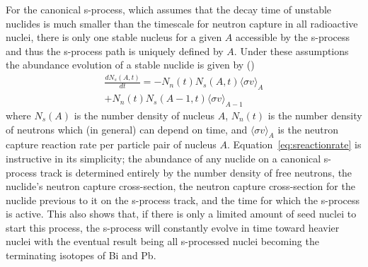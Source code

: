 For the canonical s-process, which assumes that the decay time of
unstable nuclides is much smaller than the timescale for neutron
capture in all radioactive nuclei, there is only one stable nucleus
for a given $A$ accessible by the s-process and thus the s-process
path is uniquely defined by $A$.  Under these assumptions the abundance
evolution of a stable nuclide is given by (\citealt{iliadis2008})
\begin{multline}
\label{eq:sreactionrate}
\frac{dN_s(A,t)}{dt} = - N_n(t)N_s(A,t)\langle \sigma v \rangle_A \\
+N_n(t)N_s(A-1,t)\langle \sigma v \rangle_{A-1}
\end{multline}
where $N_s(A)$ is the number density of nucleus $A$, $N_n(t)$ is the
number density of neutrons which (in general) can depend on time, and
$\langle \sigma v \rangle_A$ is the
neutron capture reaction rate per particle pair of nucleus $A$.
Equation~\ref{eq:sreactionrate} is instructive in its simplicity; the
abundance of any nuclide on a canonical s-process track is determined
entirely by the number density of free neutrons, the nuclide's neutron
capture cross-section, the neutron capture cross-section for the
nuclide previous to it on the s-process track, and the time for which
the s-process is active.  This also shows that, if there is only a
limited amount of seed nuclei to start this process, the s-process
will constantly evolve in time toward heavier nuclei with the eventual
result being all s-processed nuclei becoming the terminating isotopes
of Bi and Pb.  


